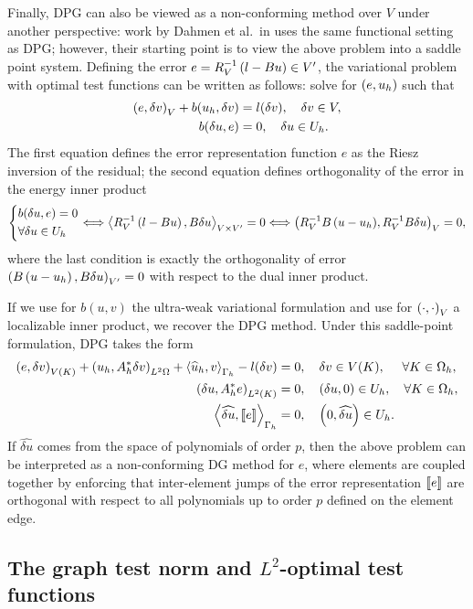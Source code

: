 Finally, DPG can also be viewed as a non-conforming method over $V$ under another perspective: work by Dahmen et al.\ in \cite{DahmenVariationalStabilization} uses the same functional setting as DPG; however, their starting point is to view the above problem into a saddle point system.  Defining the error $e = R_V^{-1}\LRp{l-Bu} \in V'$, the variational problem with optimal test functions can be written as follows: solve for $\LRp{e,u_h}$ such that
\begin{align*}
\LRp{e,\delta v}_V + b(u_h,\delta v)&= l(\delta v),\quad \delta v \in V,\\
b(\delta u, e) &= 0, \quad \delta u \in U_h.
\end{align*}
The first equation defines the error representation function $e$ as the Riesz inversion of the residual; the second equation defines orthogonality of the error in the energy inner product 
\[
\begin{dcases}
b(\delta u, e) = 0\\
\forall \delta u \in U_h 
\end{dcases}
\Longleftrightarrow \LRa{R_V^{-1}\LRp{l-Bu},B\delta u}_{V\times V'} = 0 \Longleftrightarrow \LRp{R_V^{-1}{B\LRp{u-u_h}},R_V^{-1}B\delta u}_{V}= 0,
\]
where the last condition is exactly the orthogonality of error $\LRp{B\LRp{u-u_h},B\delta u}_{V'}= 0$ with respect to the dual inner product.

If we use for $b(u,v)$ the ultra-weak variational formulation and use for $\LRp{\cdot,\cdot}_V$ a localizable inner product, we recover the DPG method.  Under this saddle-point formulation, DPG takes the form
\begin{align*}
\LRp{e,\delta v}_{V(K)} + \LRp{u_h,A^*_h\delta v}_{L^2{\Omega}} + \LRa{\uh_h,v}_{\Gh}- l(\delta v) &= 0, \quad \delta v \in V(K),\,\, \quad \forall K\in \Oh,\\
\LRp{\delta u, A_h^*e}_{L^2(K)} &= 0, \quad \LRp{\delta u,0} \in U_h, \quad \forall K\in \Oh,\\
\LRa{\widehat{\delta u}, \jump{e}}_{\Gh} &= 0, \quad \LRp{0,\widehat{\delta u}} \in U_h.
\end{align*}
If $\widehat{\delta u}$ comes from the space of polynomials of order $p$, then the above problem can be interpreted as a non-conforming DG method for $e$, where elements are coupled together by enforcing that inter-element jumps of the error representation $\jump{e}$ are orthogonal with respect to all polynomials up to order $p$ defined on the element edge.  

\subsection{The graph test norm and $L^2$-optimal test functions}

